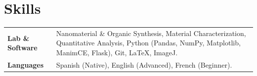 \documentclass[a4paper,12pt]{article}
\begin{document}
\section{Skills}
\begin{tabularx}{\linewidth}{@{}l X@{}}
\textbf{Lab \& Software} & Nanomaterial \& Organic Synthesis, Material Characterization, Quantitative Analysis, Python (Pandas, NumPy, Matplotlib, ManimCE, Flask), Git, \LaTeX, ImageJ. \\
\textbf{Languages} & Spanish (Native), English (Advanced), French (Beginner). \\  
\end{tabularx}

\vspace*{\fill}
\end{document}
